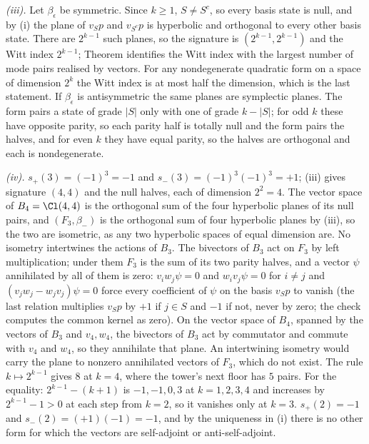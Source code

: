 \emph{(iii).} Let $\beta_{\epsilon}$ be symmetric. Since $k \ge 1$, $S \ne S^{c}$, so every basis state is null, and by (i) the plane of $v_{S}p$ and $v_{S^{c}}p$ is hyperbolic and orthogonal to every other basis state. There are $2^{k-1}$ such planes, so the signature is $(2^{k-1}, 2^{k-1})$ and the Witt index $2^{k-1}$; Theorem  identifies the Witt index with the largest number of mode pairs realised by vectors. For any nondegenerate quadratic form on a space of dimension $2^{k}$ the Witt index is at most half the dimension, which is the last statement. If $\beta_{\epsilon}$ is antisymmetric the same planes are symplectic planes. The form pairs a state of grade $|S|$ only with one of grade $k - |S|$; for odd $k$ these have opposite parity, so each parity half is totally null and the form pairs the halves, and for even $k$ they have equal parity, so the halves are orthogonal and each is nondegenerate.

\emph{(iv).} $s_{+}(3) = (-1)^{3} = -1$ and $s_{-}(3) = (-1)^{3}(-1)^{3} = +1$; (iii) gives signature $(4,4)$ and the null halves, each of dimension $2^{2} = 4$. The vector space of $B_{4} = \Cl(4,4)$ is the orthogonal sum of the four hyperbolic planes of its null pairs, and $(F_{3}, \beta_{-})$ is the orthogonal sum of four hyperbolic planes by (iii), so the two are isometric, as any two hyperbolic spaces of equal dimension are. No isometry intertwines the actions of $B_{3}$. The bivectors of $B_{3}$ act on $F_{3}$ by left multiplication; under them $F_{3}$ is the sum of its two parity halves, and a vector $\psi$ annihilated by all of them is zero: $v_{i}w_{j}\psi = 0$ and $w_{i}v_{j}\psi = 0$ for $i \ne j$ and $(v_{j}w_{j} - w_{j}v_{j})\psi = 0$ force every coefficient of $\psi$ on the basis $v_{S}p$ to vanish (the last relation multiplies $v_{S}p$ by $+1$ if $j \in S$ and $-1$ if not, never by zero; the check computes the common kernel as zero). On the vector space of $B_{4}$, spanned by the vectors of $B_{3}$ and $v_{4}, w_{4}$, the bivectors of $B_{3}$ act by commutator and commute with $v_{4}$ and $w_{4}$, so they annihilate that plane. An intertwining isometry would carry the plane to nonzero annihilated vectors of $F_{3}$, which do not exist. The rule $k \mapsto 2^{k-1}$ gives $8$ at $k = 4$, where the tower's next floor has $5$ pairs. For the equality: $2^{k-1} - (k+1)$ is $-1, -1, 0, 3$ at $k = 1, 2, 3, 4$ and increases by $2^{k-1} - 1 > 0$ at each step from $k = 2$, so it vanishes only at $k = 3$. $s_{+}(2) = -1$ and $s_{-}(2) = (+1)(-1) = -1$, and by the uniqueness in (i) there is no other form for which the vectors are self-adjoint or anti-self-adjoint.

